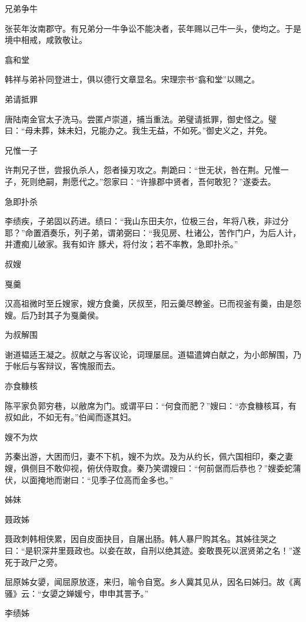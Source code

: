 \documentclass[a4paper,12pt,UTF8,twoside]{ctexbook}
\begin{document}
    兄弟争牛
    
    张苌年汝南郡守。有兄弟分一牛争讼不能决者，苌年赐以己牛一头，使均之。于是境中相戒，咸敦敬让。
    
    翕和堂
    
    韩祥与弟补同登进士，俱以德行文章显名。宋理宗书“翕和堂”以赐之。
    
    弟请抵罪
    
    唐陆南金官太子洗马。尝匿卢崇道，捕当重法。弟璧请抵罪，御史怪之。璧曰：“母未葬，妹未妇，兄能办之。我生无益，不如死。”御史义之，并免。
    
    兄惟一子
    
    许荆兄子世，尝报仇杀人，怨者操刃攻之。荆跪曰：“世无状，咎在荆。兄惟一子，死则绝嗣，荆愿代之。”怨家曰：“许掾郡中贤者，吾何敢犯？”遂委去。
    
    急即扑杀
    
    李绩疾，子弟固以药进。绩曰：“我山东田夫尔，位极三台，年将八秩，非过分耶？”命置酒奏乐，列子弟，谓弟弼曰：“我见房、杜诸公，苦作门户，为后人计，并遭痴儿破家。我有如许 豚犬，将付汝；若不率教，急即扑杀。”
    
    叔嫂
    
    戛羹
    
    汉高祖微时至丘嫂家，嫂方食羹，厌叔至，阳云羹尽轑釜。已而视釜有羹，由是怨嫂。后乃封其子为戛羹侯。
    
    为叔解围
    
    谢道韫适王凝之。叔献之与客议论，词理屡屈。道韫遣婢白献之，为小郎解围，乃于帐后与客辩议，客愧服而去。
    
    亦食糠核
    
    陈平家负郭穷巷，以敝席为门。或谓平曰：“何食而肥？”嫂曰：“亦食糠核耳，有叔如此，不如无有。”伯闻而逐其妇。
    
    嫂不为炊
    
    苏秦出游，大困而归，妻不下机，嫂不为炊。及为从约长，佩六国相印，秦之妻嫂，俱侧目不敢仰视，俯伏侍取食。秦乃笑谓嫂曰：“何前倨而后恭也？”嫂委蛇蒲伏，以面掩地而谢曰：“见季子位高而金多也。”
    
    姊妹
    
    聂政姊
    
    聂政刺韩相侠累，因自皮面抉目，自屠出肠。韩人暴尸购其名。其姊往哭之曰：“是轵深井里聂政也。以妾在故，自刑以绝其迹。妾敢畏死以泯贤弟之名！”遂死于政尸之旁。
    
    屈原姊女嬃，闻屈原放逐，来归，喻令自宽。乡人冀其见从，因名曰姊归。故《离骚》云：“女嬃之婵媛兮，申申其詈予。”
    
    李绩姊
    
\end{document}
